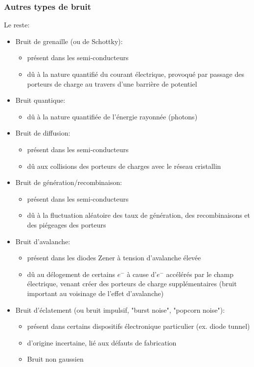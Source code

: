 \subsubsection{Autres types de bruit}
Le reste:
\begin{itemize}
	\item Bruit de grenaille (ou de Schottky):
	\begin{itemize}
		\item présent dans les semi-conducteurs
		\item dû à la nature quantifié du courant électrique, provoqué par passage des porteurs de charge au travers d'une barrière de potentiel
	\end{itemize}
	\item Bruit quantique:
	\begin{itemize}
		\item dû à la nature quantifiée de l'énergie rayonnée (photons)
	\end{itemize}
	\item Bruit de diffusion:
	\begin{itemize}
		\item présent dans les semi-conducteurs
		\item dû aux collisions des porteurs de charges avec le réseau cristallin
	\end{itemize}
	\item Bruit de génération/recombinaison:
	\begin{itemize}
		\item présent dans les semi-conducteurs
		\item  dû à la fluctuation aléatoire des taux de génération, des recombinaisons et des piégeages des porteurs
	\end{itemize}
	\item Bruit d'avalanche:
	\begin{itemize}
		\item présent dans les diodes Zener à tension d'avalanche élevée
		\item  dû au délogement de certains \(e^-\) à cause d'\(e^-\) accélérés par le champ électrique, venant créer des porteurs de charge supplémentaires (bruit important au voisinage de l'effet d'avalanche)
	\end{itemize}
	\item Bruit d'éclatement (ou bruit impulsif, "burst noise", "popcorn noise"):
	\begin{itemize}
		\item présent dans certains dispositifs électronique particulier (ex. diode tunnel)
		\item d'origine incertaine, lié aux défauts de fabrication
		\item Bruit non gaussien
	\end{itemize}
\end{itemize}
